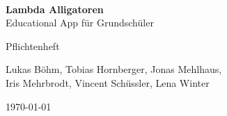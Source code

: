 \documentclass{scrreprt}
\begin{document}
\begin{titlepage}
\begin{center}
\begin{minipage}{0.4\textwidth}
	\begin{flushleft} \large
	\end{flushleft}
\end{minipage}
\begin{minipage}{0.4\textwidth}
	\begin{flushright} \large
	\end{flushright}
\end{minipage} \\[2cm]
\end{center}
\begin{center}
	{\huge \bfseries Lambda Alligatoren}\\[0.1cm] 
	{\large Educational App für Grundschüler}
\end{center}


\begin{center}
	{\Large Pflichtenheft}\\[0.5cm]
\end{center}
\begin{center}
	{Lukas Böhm, Tobias Hornberger, Jonas Mehlhaus, \\ Iris Mehrbrodt, Vincent Schüssler, Lena Winter} \\[1cm]
\end{center}

\begin{center}
	{\large \today}
\end{center}
	
	
	\begin{center}
	\end{center}
	\vfill


\end{titlepage}

\iffalse
\title{Pflichtenheft}
\author{ 
	Lukas Böhm\and 
	Tobias Hornberger\and 
	Jonas Mehlhaus\and 
	Iris Mehrbrodt\and 
	Vincent Schüßler \and 
	Lena Winter
}
\date{\today}

\maketitle
\thispagestyle{empty}

\fi
{}

\clearpage
\pagestyle{empty}
\tableofcontents

\clearpage
\pagestyle{plain}
\setcounter{page}{1}











\end{document}

